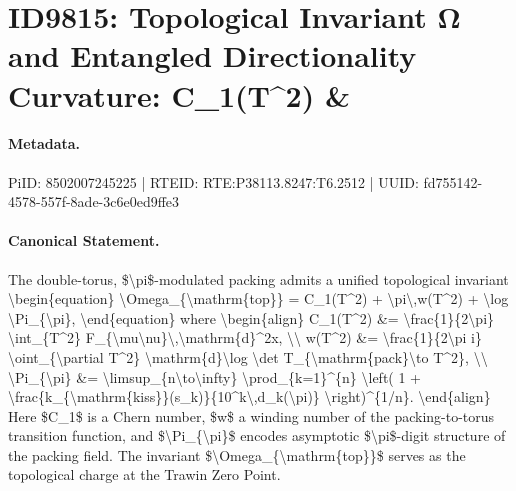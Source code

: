 \section*{ID9815: Topological Invariant Ω and Entangled Directionality Curvature: C\_1(T\textasciicircum{}2) \&}
\paragraph{Metadata.}
PiID: 8502007245225 | RTEID: RTE:P38113.8247:T6.2512 | UUID: fd755142-4578-557f-8ade-3c6e0ed9ffe3

\paragraph{Canonical Statement.}
The double-torus, \$\textbackslash{}pi\$-modulated packing admits a unified topological invariant \textbackslash{}begin\{equation\} \textbackslash{}Omega\_\{\textbackslash{}mathrm\{top\}\} = C\_1(T\textasciicircum{}2) + \textbackslash{}pi\textbackslash{},w(T\textasciicircum{}2) + \textbackslash{}log \textbackslash{}Pi\_\{\textbackslash{}pi\}, \textbackslash{}end\{equation\} where \textbackslash{}begin\{align\} C\_1(T\textasciicircum{}2) \&= \textbackslash{}frac\{1\}\{2\textbackslash{}pi\} \textbackslash{}int\_\{T\textasciicircum{}2\} F\_\{\textbackslash{}mu\textbackslash{}nu\}\textbackslash{},\textbackslash{}mathrm\{d\}\textasciicircum{}2x, \textbackslash{}\textbackslash{} w(T\textasciicircum{}2) \&= \textbackslash{}frac\{1\}\{2\textbackslash{}pi i\} \textbackslash{}oint\_\{\textbackslash{}partial T\textasciicircum{}2\} \textbackslash{}mathrm\{d\}\textbackslash{}log \textbackslash{}det T\_\{\textbackslash{}mathrm\{pack\}\textbackslash{}to T\textasciicircum{}2\}, \textbackslash{}\textbackslash{} \textbackslash{}Pi\_\{\textbackslash{}pi\} \&= \textbackslash{}limsup\_\{n\textbackslash{}to\textbackslash{}infty\} \textbackslash{}prod\_\{k=1\}\textasciicircum{}\{n\} \textbackslash{}left( 1 + \textbackslash{}frac\{k\_\{\textbackslash{}mathrm\{kiss\}\}(s\_k)\}\{10\textasciicircum{}k\textbackslash{},d\_k(\textbackslash{}pi)\} \textbackslash{}right)\textasciicircum{}\{1/n\}. \textbackslash{}end\{align\} Here \$C\_1\$ is a Chern number, \$w\$ a winding number of the packing-to-torus transition function, and \$\textbackslash{}Pi\_\{\textbackslash{}pi\}\$ encodes asymptotic \$\textbackslash{}pi\$-digit structure of the packing field. The invariant \$\textbackslash{}Omega\_\{\textbackslash{}mathrm\{top\}\}\$ serves as the topological charge at the Trawin Zero Point.

